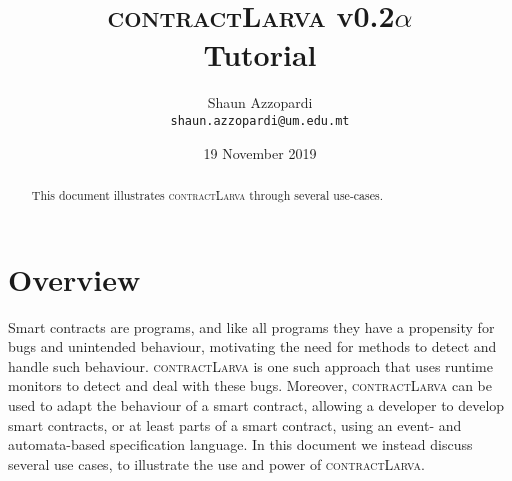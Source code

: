 \documentclass{article}
\newcommand{\contractlarva}{\textsc{contractLarva}\xspace}
\begin{document}
\title{\contractlarva v0.2$\alpha$\\Tutorial}
\author{Shaun Azzopardi\\\texttt{shaun.azzopardi@um.edu.mt}}
\date{19 November 2019}
\maketitle



\begin{abstract}
This document illustrates \contractlarva through several use-cases. %
\end{abstract}

\tableofcontents

 \section{Overview}
 
 Smart contracts are programs, and like all programs they have a propensity for bugs and unintended behaviour, motivating the need for methods to detect and handle such behaviour. \contractlarva is one such approach that uses runtime monitors to detect and deal with these bugs. Moreover, \contractlarva can be used to adapt the behaviour of a smart contract, allowing a developer to develop smart contracts, or at least parts of a smart contract, using an event- and automata-based specification language. In this document we instead discuss several use cases, to illustrate the use and power of \contractlarva. 
 
\end{document}
